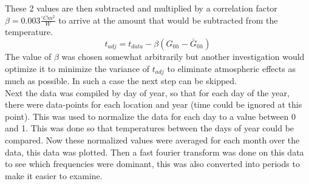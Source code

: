 These 2 values are then subtracted and multiplied by a correlation factor \(\beta = 0.003 \frac{^\circ C m^2}{W}\) to arrive at the amount that would be subtracted from the temperature.
\begin{equation}
    t_{adj} = t_{data} - \beta(G_{0h}-\bar{G}_{0h})
\end{equation}
The value of \(\beta\) was chosen somewhat arbitrarily but another investigation would optimize it to minimize the variance of \(t_{adj}\) to eliminate atmospheric effects as much as possible. In such a case the next step can be skipped.\\

Next the data was compiled by day of year, so that for each day of the year, there were data-points for each location and year (time could be ignored at this point). This was used to normalize the data for each day to a value between 0 and 1. This was done so that temperatures between the days of year could be compared. Now these normalized values were averaged for each month over the data, this data was plotted. Then a fast fourier transform was done on this data to see which frequencies were dominant, this was also converted into periods to make it easier to examine.
